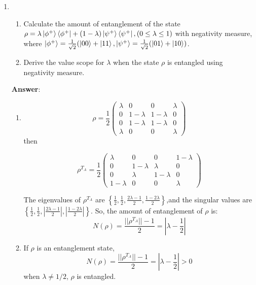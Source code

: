 \documentclass[english,aps,onecolumn]{revtex4-1}
\begin{document}
\begin{enumerate}[1.]
\item
	\begin{enumerate}[(1)]
\item Calculate the amount of entanglement of the state  $\rho=\lambda\ket{\phi^+}\bra{\phi^+}+(1-\lambda)\ket{\psi^+}\bra{\psi^+},(0\leq\lambda\leq1)$ with negativity measure,
where $\ket{\phi^+}=\frac{1}{\sqrt{2}}(\ket{00}+\ket{11}, \ket{\psi^+}=\frac{1}{\sqrt{2}}(\ket{01}+\ket{10})$.
\item Derive the value scope for $\lambda$ when the state $\rho$ is entangled using negativity measure.
	\end{enumerate}

\textbf{Answer}:
	\begin{enumerate}[(1)]
	\item
$$
\rho=\frac{1}{2}
\begin{pmatrix}
\lambda & 0 & 0 & \lambda \\
0 & 1-\lambda & 1-\lambda & 0 \\
0 & 1-\lambda & 1-\lambda & 0 \\
\lambda & 0 & 0 & \lambda
\end{pmatrix}
$$
then

$$
\rho^{T_A} =\frac{1}{2}
\begin{pmatrix}
\lambda & 0 & 0 & 1-\lambda \\
0 & 1-\lambda &\lambda & 0 \\
0 & \lambda & 1-\lambda & 0 \\
1-\lambda & 0 & 0 &\lambda
\end{pmatrix}
$$

The eigenvalues of $\rho^{T_A}$ are $\left\{\frac{1}{2},\frac{1}{2},\frac{2\lambda-1}{2},\frac{1-2\lambda}{2}\right\}$,and the singular values are $\left\{\frac{1}{2},\frac{1}{2},|\frac{2\lambda-1}{2}|,|\frac{1-2\lambda}{2}|\right\}$. So, the amount of entanglement of $\rho$ is: $$ N(\rho)=\frac{||\rho^{T_A}||-1}{2}=|\lambda-\frac{1}{2}| $$


\item
If $\rho$ is an entanglement state,
$$N(\rho)=\frac{||\rho^{T_A}||-1}{2}=|\lambda-\frac{1}{2}|>0$$
when $\lambda \neq 1/2$, $\rho$ is entangled.
\end{enumerate}



\end{enumerate}
\end{document}
